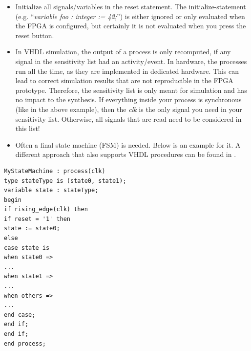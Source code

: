 \begin{itemize}
\item
  Initialize all signals/variables in the reset statement. The
  initialize-statement (e.g. ``\emph{variable foo : integer := 42;}'')
  is either ignored or only evaluated when the FPGA is configured, but
  certainly it is not evaluated when you press the reset button.
\item
  In VHDL simulation, the output of a process is only recomputed, if any
  signal in the sensitivity list had an activity/event. In hardware, the
  processes run all the time, as they are implemented in dedicated
  hardware. This can lead to correct simulation results that are not
  reproducible in the FPGA prototype. Therefore, the sensitivity list is
  only meant for simulation and has no impact to the synthesis. If
  everything inside your process is synchronous (like in the above
  example), then the \emph{clk} is the only signal you need in your
  sensitivity list. Otherwise, all signals that are read need to be
  considered in this list!
\item
  Often a final state machine (FSM) is needed. Below is an example for
  it. A different approach that also supports VHDL procedures can be
  found in \cite{FSM}.
\end{itemize}
\begin{lstlisting}
MyStateMachine : process(clk)
type stateType is (state0, state1);
variable state : stateType;
begin
if rising_edge(clk) then
if reset = '1' then
state := state0;
else
case state is
when state0 =>
...
when state1 =>
...
when others =>
...
end case;
end if;
end if;
end process;	
\end{lstlisting}


